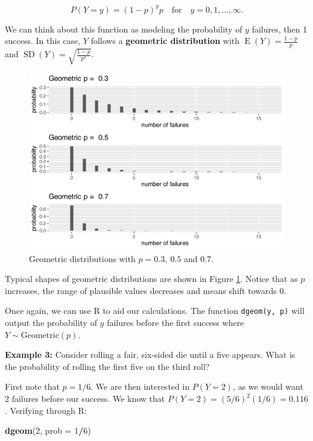 \documentclass[
]{krantz}
\newenvironment{Shaded}{\begin{snugshade}}{\end{snugshade}}
\newcommand{\DataTypeTok}[1]{\textcolor[rgb]{0.27,0.27,0.27}{#1}}
\newcommand{\DecValTok}[1]{\textcolor[rgb]{0.06,0.06,0.06}{#1}}
\newcommand{\KeywordTok}[1]{\textcolor[rgb]{0.27,0.27,0.27}{\textbf{#1}}}
\newcommand{\NormalTok}[1]{#1}
\newcommand{\OperatorTok}[1]{\textcolor[rgb]{0.43,0.43,0.43}{\textbf{#1}}}
\newcommand{\E}{\operatorname{E}}
\newcommand{\SD}{\operatorname{SD}}
\begin{document}
\begin{equation}
P(Y=y) = (1-p)^yp \quad \textrm{for}\quad y = 0, 1, \ldots, \infty.
\label{eq:geomRV}
\end{equation}

We can think about this function as modeling the probability of \(y\) failures, then 1 success. In this case, \(Y\) follows a \textbf{geometric distribution}  with \(\E(Y) = \frac{1-p}p\) and \(\SD(Y) = \sqrt{\frac{1-p}{p^2}}\).



\begin{figure}

{\centering \includegraphics[width=0.6\linewidth]{bookdown-BeyondMLR_files/figure-latex/multGeo-1} 

}

\caption{Geometric distributions with \(p = 0.3,\ 0.5\) and \(0.7\).}\label{fig:multGeo}
\end{figure}

Typical shapes of geometric distributions are shown in Figure \ref{fig:multGeo}. Notice that as \(p\) increases, the range of plausible values decreases and means shift towards 0.

Once again, we can use R to aid our calculations. The function \texttt{dgeom(y,\ p)} will output the probability of \(y\) failures before the first success where \(Y \sim \textrm{Geometric}(p)\).

\textbf{Example 3:} Consider rolling a fair, six-sided die until a five appears. What is the probability of rolling the first five on the third roll?

First note that \(p = 1/6\). We are then interested in \(P(Y=2)\), as we would want 2 failures before our success. We know that \(P(Y=2) = (5/6)^2(1/6) = 0.116\). Verifying through R:

\begin{Shaded}
\begin{Highlighting}[]
\KeywordTok{dgeom}\NormalTok{(}\DecValTok{2}\NormalTok{, }\DataTypeTok{prob =} \DecValTok{1}\OperatorTok{/}\DecValTok{6}\NormalTok{)}
\end{Highlighting}
\end{Shaded}
\end{document}
